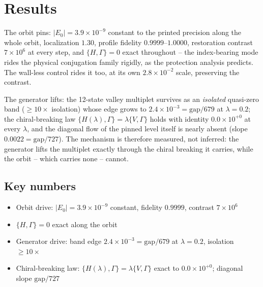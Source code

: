 \documentclass[11pt,a4paper]{article}
\begin{document}
\section{Results}
The orbit pins: $|E_0| = 3.9\times10^{-9}$ constant to the printed precision along the whole orbit, localization $1.30$, profile fidelity $0.9999$--$1.0000$, restoration contrast $7\times10^{6}$ at every step, and $\{H, \Gamma\} = 0$ exact throughout -- the index-bearing mode rides the physical conjugation family rigidly, as the protection analysis predicts. The wall-less control rides it too, at its own $2.8\times10^{-2}$ scale, preserving the contrast.

The generator lifts: the 12-state valley multiplet survives as an \emph{isolated} quasi-zero band ($\ge 10\times$ isolation) whose edge grows to $2.4\times10^{-3} = \mathrm{gap}/679$ at $\lambda = 0.2$; the chiral-breaking law $\{H(\lambda), \Gamma\} = \lambda\{V, \Gamma\}$ holds with identity $0.0\times10^{+0}$ at every $\lambda$, and the diagonal flow of the pinned level itself is nearly absent (slope $0.0022 = \mathrm{gap}/727$). The mechanism is therefore measured, not inferred: the generator lifts the multiplet exactly through the chiral breaking it carries, while the orbit -- which carries none -- cannot.

\subsection{Key numbers}
\begin{tcolorbox}[colback=labblue!6, colframe=labblue!70!black, boxrule=0.6pt, title={Key results (canonical run)}]
\begin{itemize}[leftmargin=1.2em, itemsep=0.15em]
\item Orbit drive: $|E_0| = 3.9\times10^{-9}$ constant, fidelity $0.9999$, contrast $7\times10^{6}$
\item $\{H, \Gamma\} = 0$ exact along the orbit
\item Generator drive: band edge $2.4\times10^{-3} = \mathrm{gap}/679$ at $\lambda = 0.2$, isolation $\ge 10\times$
\item Chiral-breaking law: $\{H(\lambda),\Gamma\} = \lambda\{V,\Gamma\}$ exact to $0.0\times10^{+0}$; diagonal slope $\mathrm{gap}/727$
\end{itemize}
\end{tcolorbox}
\end{document}
